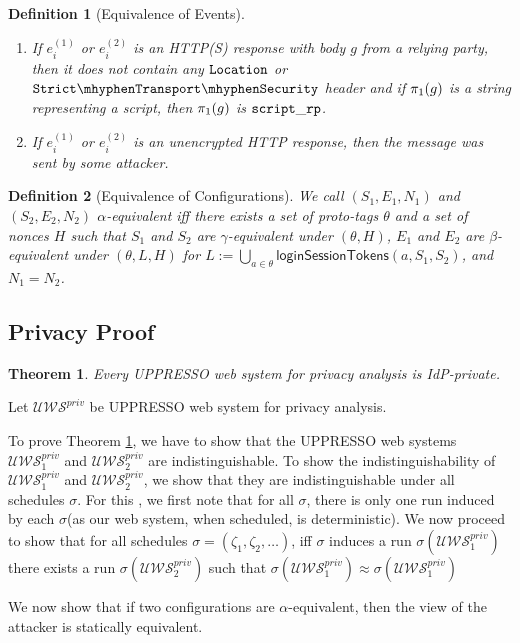 \documentclass[letterpaper,onecolumn,10pt]{article}
\newtheorem{theorem}{Theorem}
\newtheorem{definition}{Definition}
\begin{document}
\begin{definition}[Equivalence of Events]
\begin{enumerate}
      then $e_i^{(1)}$ is an HTTP(S) request from $b_1$ to $r_1$ 
      and $e_i^{q(2)}$ is an HTTP(S) request from $b_2$ to $r_2$ 
      and the bodies of both HTTP messages are of the form
      $\an{\an{\str{t}, t}}$.
    \item\label{eqe:pre:rp-scripts} If $e_i^{(1)}$ or $e_i^{(2)}$ is an
      HTTP(S) response with body $g$ from a relying party, then it does
      not contain any $\mathtt{Location}$ or $\cSTS$ header
      and if $\pi_{1}({g})$ is a string representing a script, then
      $\pi_{1}({g})$ is $\mathtt{script\_rp}$.
    \item\label{eqe:pre:unencrypted-http} If $e_i^{(1)}$ or $e_i^{(2)}$
      is an unencrypted HTTP response, then the message was sent by some
      attacker.
  \end{enumerate}
\end{definition}

\begin{definition}[Equivalence of Configurations]
  We call $(S_1,E_1,N_1)$ and $(S_2,E_2,N_2)$
  \emph{$\alpha$-equivalent} iff there exists a set of proto-tags
  $\theta$ and a set of nonces $H$ such that $S_1$ and $S_2$ are
  $\gamma$-equivalent under $(\theta,H)$, $E_1$ and $E_2$ are
  $\beta$-equivalent under $(\theta,L,H)$ for
  $L := \bigcup_{a\in\theta} \mathsf{loginSessionTokens}(a,S_1,S_2)$,
  and $N_1 = N_2$.
\end{definition}

\subsection{Privacy Proof}

\begin{theorem} \label{theorem:A}Every UPPRESSO web system for privacy analysis is IdP-private.
\end{theorem}

Let $\mathcal{U\!W\!S}^{priv}$ be UPPRESSO web system for privacy analysis.\par
To prove Theorem \ref{theorem:A}, we have to show that the UPPRESSO web systems $\mathcal{U\!W\!S}^{priv}_1$ and $\mathcal{U\!W\!S}^{priv}_2$ 
are indistinguishable. To show the indistinguishability of $\mathcal{U\!W\!S}^{priv}_1$ and $\mathcal{U\!W\!S}^{priv}_2$, 
we show that they are indistinguishable under all schedules $\sigma$.
For this , we first note that for all $\sigma$, there is only one run induced by each $\sigma$(as our web system, when scheduled, is deterministic).
We now proceed to show that for all schedules $\sigma=(\zeta _1, \zeta_2,\dots)$, iff $\sigma$ induces a run $\sigma(\mathcal{U\!W\!S}^{priv}_1)$ there exists a run $\sigma(\mathcal{U\!W\!S}^{priv}_2)$ such that $\sigma(\mathcal{U\!W\!S}^{priv}_1)\approx\sigma(\mathcal{U\!W\!S}^{priv}_1)$\par
We now show that if two configurations are $\alpha$-equivalent, then the view of the attacker is statically equivalent.
\end{document}
